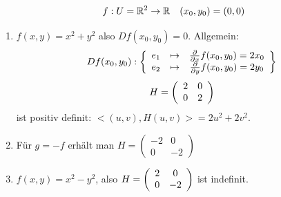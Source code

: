 \documentclass[main.tex]{subfiles}
\begin{document}
\begin{Beispiel}
  $$f: U = \mathbb{R}^2 \to \mathbb{R} \quad (x_0,y_0) = (0,0)$$
  \begin{enumerate}
    \item $f(x,y) = x^2 + y^2$ also $Df(x_0,y_0) = 0$. Allgemein:
      $$Df(x_0,y_0):
      \left\{ \begin{array}{c c c}
        e_1 & \mapsto & \frac{\partial}{\partial x} f(x_0,y_0) = 2 x_0 \\
        e_2 & \mapsto & \frac{\partial}{\partial y} f(x_0,y_0) = 2 y_0
      \end{array} \right\}$$
      $$H = \left(\begin{array}{c c}
        2 & 0 \\
        0 & 2
      \end{array}\right)$$
      ist positiv definit: $<(u,v),H(u,v)> = 2u^2 + 2v^2$.
      \begin{center}
      \end{center}
    \item Für $g = -f$ erhält man $H = \begin{pmatrix}
        -2 & 0 \\ 0 & -2
      \end{pmatrix}$
    \item $f(x,y) = x^2 - y^2$, also $H = \left(\begin{array}{c c}
      2 & 0 \\
      0 & -2
    \end{array}\right)$ ist indefinit.
    \begin{center}
    \end{center}
  \end{enumerate}
\end{Beispiel}
\end{document}
